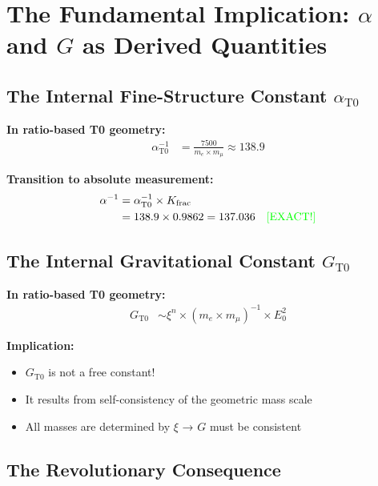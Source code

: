 \documentclass[12pt,a4paper]{article}
\begin{document}
	\section{The Fundamental Implication: $\alpha$ and $G$ as Derived Quantities}
	
	\subsection{The Internal Fine-Structure Constant $\alpha_{\text{T0}}$}
	
	\textbf{In ratio-based T0 geometry:}
	\begin{align*}
		\alpha_{\text{T0}}^{-1} &= \frac{7500}{m_e \times m_μ} \approx 138.9
	\end{align*}
	
	\textbf{Transition to absolute measurement:}
	\begin{align*}
		\alpha^{-1} &= \alpha_{\text{T0}}^{-1} \times K_{\text{frac}} \\
		&= 138.9 \times 0.9862 = 137.036 \quad \text{\textcolor{green}{[EXACT!]}}
	\end{align*}
	
	\subsection{The Internal Gravitational Constant $G_{\text{T0}}$}
	
	\textbf{In ratio-based T0 geometry:}
	\begin{align*}
		G_{\text{T0}} &\sim \xi^n \times (m_e \times m_μ)^{-1} \times E_0^2
	\end{align*}
	
	\textbf{Implication:}
	\begin{itemize}
		\item $G_{\text{T0}}$ is not a free constant!
		\item It results from self-consistency of the geometric mass scale
		\item All masses are determined by $\xi$ → $G$ must be consistent
	\end{itemize}
	
	\subsection{The Revolutionary Consequence}
	
	\begin{center}
	\end{center}
	
\end{document}
